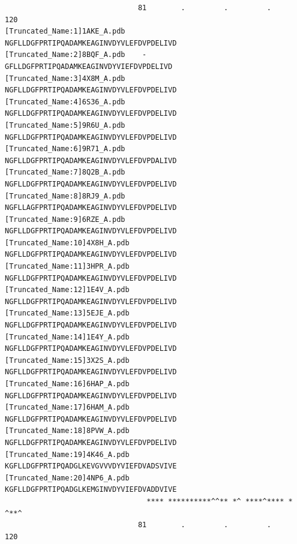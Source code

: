 \documentclass[
  letterpaper,
  DIV=11,
  numbers=noendperiod]{scrartcl}
\begin{document}
\begin{verbatim}
                               81        .         .         .         120 
[Truncated_Name:1]1AKE_A.pdb    NGFLLDGFPRTIPQADAMKEAGINVDYVLEFDVPDELIVD
[Truncated_Name:2]8BQF_A.pdb    -GFLLDGFPRTIPQADAMKEAGINVDYVIEFDVPDELIVD
[Truncated_Name:3]4X8M_A.pdb    NGFLLDGFPRTIPQADAMKEAGINVDYVLEFDVPDELIVD
[Truncated_Name:4]6S36_A.pdb    NGFLLDGFPRTIPQADAMKEAGINVDYVLEFDVPDELIVD
[Truncated_Name:5]9R6U_A.pdb    NGFLLDGFPRTIPQADAMKEAGINVDYVLEFDVPDELIVD
[Truncated_Name:6]9R71_A.pdb    NGFLLDGFPRTIPQADAMKEAGINVDYVLEFDVPDALIVD
[Truncated_Name:7]8Q2B_A.pdb    NGFLLDGFPRTIPQADAMKEAGINVDYVLEFDVPDELIVD
[Truncated_Name:8]8RJ9_A.pdb    NGFLLAGFPRTIPQADAMKEAGINVDYVLEFDVPDELIVD
[Truncated_Name:9]6RZE_A.pdb    NGFLLDGFPRTIPQADAMKEAGINVDYVLEFDVPDELIVD
[Truncated_Name:10]4X8H_A.pdb   NGFLLDGFPRTIPQADAMKEAGINVDYVLEFDVPDELIVD
[Truncated_Name:11]3HPR_A.pdb   NGFLLDGFPRTIPQADAMKEAGINVDYVLEFDVPDELIVD
[Truncated_Name:12]1E4V_A.pdb   NGFLLDGFPRTIPQADAMKEAGINVDYVLEFDVPDELIVD
[Truncated_Name:13]5EJE_A.pdb   NGFLLDGFPRTIPQADAMKEAGINVDYVLEFDVPDELIVD
[Truncated_Name:14]1E4Y_A.pdb   NGFLLDGFPRTIPQADAMKEAGINVDYVLEFDVPDELIVD
[Truncated_Name:15]3X2S_A.pdb   NGFLLDGFPRTIPQADAMKEAGINVDYVLEFDVPDELIVD
[Truncated_Name:16]6HAP_A.pdb   NGFLLDGFPRTIPQADAMKEAGINVDYVLEFDVPDELIVD
[Truncated_Name:17]6HAM_A.pdb   NGFLLDGFPRTIPQADAMKEAGINVDYVLEFDVPDELIVD
[Truncated_Name:18]8PVW_A.pdb   NGFLLDGFPRTIPQADAMKEAGINVDYVLEFDVPDELIVD
[Truncated_Name:19]4K46_A.pdb   KGFLLDGFPRTIPQADGLKEVGVVVDYVIEFDVADSVIVE
[Truncated_Name:20]4NP6_A.pdb   KGFLLDGFPRTIPQADGLKEMGINVDYVIEFDVADDVIVE
                                 **** **********^^** *^ ****^**** * ^**^ 
                               81        .         .         .         120 


\end{verbatim}
\end{document}
